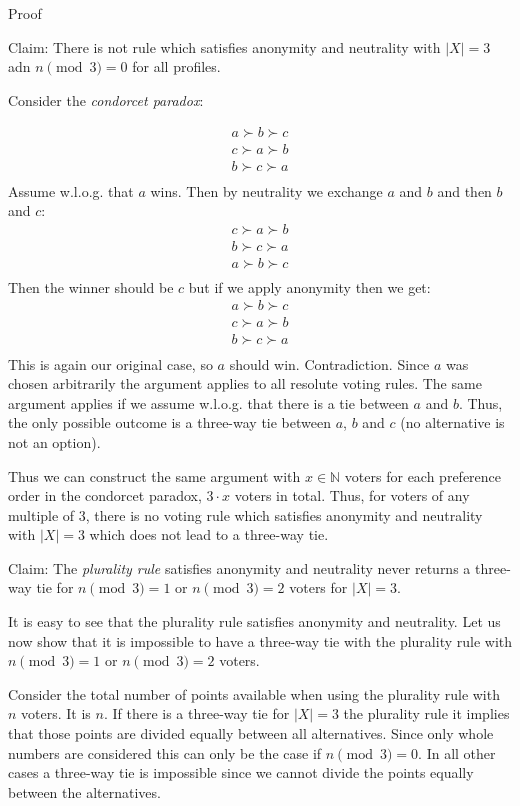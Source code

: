 \documentclass[12pt]{article}
\newcommand{\N}{\mathbb{N}}
\newenvironment{answer}[2][Answer]{\begin{trivlist}
\item[\hskip \labelsep {\bfseries #1}\hskip \labelsep {\bfseries #2:}]}{\end{trivlist}}
\begin{document}
\begin{answer}{a)}{Proof}

Claim: There is not rule which satisfies anonymity and neutrality with $|X|=3$ adn $n\pmod 3=0$ for all profiles.

Consider the \textit{condorcet paradox}:

\begin{align*}
a \succ b \succ c \\
c \succ a \succ b \\
b \succ c \succ a \\
\end{align*}
Assume w.l.o.g. that $a$ wins. Then by neutrality we exchange $a$ and $b$ and then $b$ and $c$:
\begin{align*}
c \succ a \succ b \\
b \succ c \succ a \\
a \succ b \succ c \\
\end{align*}
Then the winner should be $c$ but if we apply anonymity then we get:
\begin{align*}
a \succ b \succ c \\
c \succ a \succ b \\
b \succ c \succ a \\
\end{align*}
This is again our original case, so $a$ should win. Contradiction. Since $a$ was chosen arbitrarily the argument applies to all resolute voting rules. The same argument applies if we assume w.l.o.g. that there is a tie between $a$ and $b$. Thus, the only possible outcome is a three-way tie between $a$, $b$ and $c$ (no alternative is not an option).

Thus we can construct the same argument with $x \in \N$ voters for each preference order in the condorcet paradox, $3 \cdot x$ voters in total. Thus, for voters of any multiple of $3$, there is no voting rule which satisfies anonymity and neutrality with $|X|=3$ which does not lead to a three-way tie.

Claim: The \textit{plurality rule} satisfies anonymity and neutrality never returns a three-way tie for $n\pmod 3=1$ or $n\pmod 3=2$ voters for $|X|=3$.

It is easy to see that the plurality rule satisfies anonymity and neutrality. Let us now show that it is impossible to have a three-way tie with the plurality rule with $n\pmod 3=1$ or $n\pmod 3=2$ voters.

Consider the total number of points available when using the plurality rule with $n$ voters. It is $n$. If there is a three-way tie for $|X|=3$ the plurality rule it implies that those points are divided equally between all alternatives. Since only whole numbers are considered this can only be the case if $n\pmod 3=0$. In all other cases a three-way tie is impossible since we cannot divide the points equally between the alternatives.
\end{answer}
\end{document}
